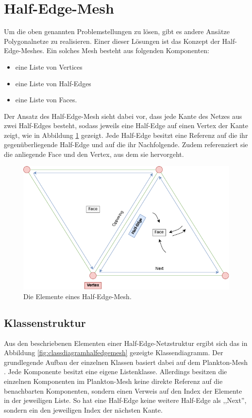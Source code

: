 \section{Half-Edge-Mesh}
Um die oben genannten Problemstellungen zu l\"osen, gibt es andere Ans\"atze Polygonalnetze zu realisieren. Einer dieser L\"osungen ist das Konzept der Half-Edge-Meshes. Ein solches Mesh besteht aus folgenden Komponenten: 
\begin{itemize}
	\item eine Liste von Vertices
	\item eine Liste von Half-Edges
	\item eine Liste von Faces.
\end{itemize}
Der Ansatz des Half-Edge-Mesh sieht dabei vor, dass jede Kante des Netzes aus zwei Half-Edges besteht, sodass jeweils eine Half-Edge auf einen Vertex der Kante zeigt, wie in Abbildung \ref{fig:half-edge-mesh} gezeigt.
Jede Half-Edge besitzt eine Referenz auf die ihr gegen\"uberliegende Half-Edge und auf die ihr Nachfolgende. Zudem referenziert sie die anliegende Face und den Vertex, aus dem sie hervorgeht.
\begin{figure}[t]
	\centering
	\includegraphics[width=0.7\linewidth]{Images/half-edge-mesh}
	\caption[Half-Edge-Mesh Schematik]{Die Elemente eines Half-Edge-Mesh.}
	\label{fig:half-edge-mesh}
\end{figure}

\subsection{Klassenstruktur}
Aus den beschriebenen Elementen einer Half-Edge-Netzstruktur ergibt sich das in Abbildung \ref{fig:classdiagramhalfedgemesh} gezeigte Klassendiagramm. Der grundlegende Aufbau der einzelnen Klassen basiert dabei auf dem Plankton-Mesh \cite{Meshmash2017}. Jede Komponente besitzt eine eigene Listenklasse. Allerdings besitzen die einzelnen Komponenten im Plankton-Mesh keine direkte Referenz auf die benachbarten Komponenten, sondern einen Verweis auf den Index der Elemente in der jeweiligen Liste. So hat eine Half-Edge keine weitere Half-Edge als ,,Next'', sondern ein den jeweiligen Index der n\"achsten Kante.

